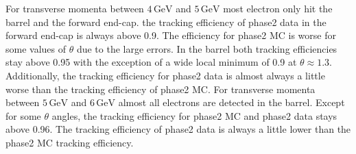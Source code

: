 \documentclass[a4paper,11pt,twosided,final,german,openbib,pdftex,listof=totoc,bibliography=totoc]{scrbook}
\begin{document}
For transverse momenta between $4\,\textrm{GeV}$ and $5\,\textrm{GeV}$ most electron only hit the barrel and the forward end-cap. the tracking efficiency of phase2 data in the forward end-cap is always above 0.9. The efficiency for phase2 MC is worse for some values of $\theta$ due to the large errors. In the barrel both tracking efficiencies stay above 0.95 with the exception of a wide local minimum of 0.9 at $\theta \approx 1.3$. Additionally, the tracking efficiency for phase2 data is almost always a little worse than the tracking efficiency of phase2 MC.
For transverse momenta between $5\,\textrm{GeV}$ and $6\,\textrm{GeV}$ almost all electrons are detected in the barrel. Except for some $\theta$ angles, the tracking efficiency for phase2 MC and phase2 data stays above 0.96. The tracking efficiency of phase2 data is always a little lower than the phase2 MC tracking efficiency. 
\end{document}
